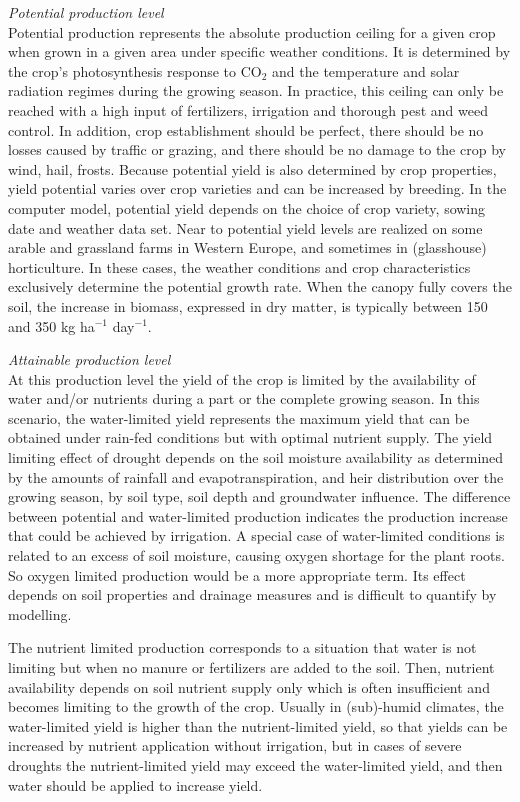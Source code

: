 {\it Potential production level\/}\\
Potential production represents the absolute production ceiling for a given crop when grown in 
a given area under specific weather conditions. It is determined by the crop’s photosynthesis
response to CO$_{2}$ 
and the temperature and solar radiation regimes during the growing season. In practice, this 
ceiling can only be reached with a high input of fertilizers, irrigation and thorough pest and
weed control. In addition, crop establishment should be perfect, there should be no losses 
caused by traffic or grazing, and there should be no damage to the crop by wind, hail, frosts.
Because potential yield is also determined by crop properties, yield potential varies over
crop varieties and can be increased by breeding. In the computer model, potential yield 
depends on the choice of crop variety, sowing date and weather data set. Near to potential 
yield levels are realized on some arable and grassland farms in Western Europe, and 
sometimes in (glasshouse) horticulture. In these cases, the weather conditions and 
crop characteristics exclusively determine the potential growth rate. When the canopy 
fully covers the soil, the increase in biomass, expressed in dry matter, is typically 
between 150 and 350 kg ha$^{-1}$ day$^{-1}$.

{\it Attainable production level\/}\\
At this production level the yield of the crop is limited by the availability of water and/or nutrients 
during a part or the complete growing season.  
In this scenario, the water-limited yield represents the maximum yield that can be obtained under 
rain-fed conditions but with optimal nutrient supply. The yield limiting effect of drought depends on 
the soil moisture availability as determined by the amounts of rainfall and evapotranspiration, and 
heir distribution over the growing season, by soil type, soil depth and groundwater influence. The 
difference between potential and water-limited production indicates the production increase that 
could be achieved by irrigation. A special case of water-limited conditions is related to an excess 
of soil moisture, causing oxygen shortage for the plant roots. So oxygen limited production would be 
a more appropriate term. Its effect depends on soil properties and drainage measures and is difficult 
to quantify by modelling.

The nutrient limited production corresponds to a situation that water is not limiting but when no 
manure or fertilizers are added to the soil. Then, nutrient availability depends on soil nutrient supply only
which is often insufficient and becomes limiting to the growth of the crop. 
Usually in (sub)-humid climates, the water-limited yield 
is higher than the nutrient-limited yield, so that yields can be increased by nutrient application without 
irrigation, but in cases of severe droughts the nutrient-limited yield may exceed the water-limited 
yield, and then water should be applied to increase yield.

